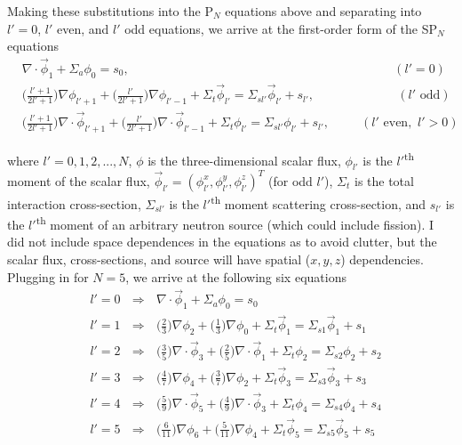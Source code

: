 \documentclass[10pt]{article}
\begin{document}
Making these substitutions into the P$_N$ equations above and separating into $l'=0$, $l'$ even, and $l'$ odd equations, we arrive at the first-order form of the SP$_N$ equations
%
\begin{align*}
    &\nabla \cdot \vec{\phi}_1 + \Sigma_a \phi_0 = s_0, \hspace{255pt}(l'=0)\\
    &\Big(\frac{l'+1}{2l'+1}\Big) \nabla\phi_{l'+1} + \Big(\frac{l'}{2l'+1}\Big)\nabla\phi_{l'-1} + \Sigma_t \vec{\phi}_{l'} = \Sigma_{sl'} \vec{\phi}_{l'} + s_{l'}, \hspace{80pt}(l'\textrm{ odd})\\
    &\Big(\frac{l'+1}{2l'+1}\Big) \nabla \cdot \vec{\phi}_{l'+1} + \Big(\frac{l'}{2l'+1}\Big)\nabla\cdot\vec{\phi}_{l'-1} + \Sigma_t \phi_{l'} = \Sigma_{sl'} \phi_{l'} + s_{l'}, \hspace{30pt}(l'\textrm{ even},\,\,l'>0)
\end{align*}

where $l'=0,1,2, ... , N$, $\phi$ is the three-dimensional scalar flux, $\phi_{l'}$ is the ${l'}$\textsuperscript{th} moment of the scalar flux, $\vec{\phi}_{l'} = (\phi_{l'}^x,\phi_{l'}^y,\phi_{l'}^z)^T$ (for odd $l'$), $\Sigma_t$ is the total interaction cross-section, $\Sigma_{sl'}$ is the ${l'}$\textsuperscript{th} moment scattering cross-section, and $s_{l'}$ is the ${l'}$\textsuperscript{th} moment of an arbitrary neutron source (which could include fission). I did not include space dependences in the equations as to avoid clutter, but the scalar flux, cross-sections, and source will have spatial ($x,y,z$) dependencies.\\

Plugging in for $N=5$, we arrive at the following six equations
%
\begin{align*}
    &l'=0\ \ \ \Rightarrow\ \ \ \nabla \cdot \vec{\phi}_1 + \Sigma_a \phi_0 = s_0\\
    &l'=1\ \ \ \Rightarrow\ \ \ \Big(\frac{2}{3}\Big) \nabla\phi_{2} + \Big(\frac{1}{3}\Big)\nabla\phi_{0} + \Sigma_t \vec{\phi}_{1} = \Sigma_{s1} \vec{\phi}_{1} + s_{1}\\
    &l'=2\ \ \ \Rightarrow\ \ \ \Big(\frac{3}{5}\Big) \nabla \cdot \vec{\phi}_{3} + \Big(\frac{2}{5}\Big)\nabla\cdot\vec{\phi}_{1} + \Sigma_t \phi_{2} = \Sigma_{s2} \phi_{2} + s_{2} \\
    &l'=3\ \ \ \Rightarrow\ \ \ \Big(\frac{4}{7}\Big) \nabla\phi_{4} + \Big(\frac{3}{7}\Big)\nabla\phi_{2} + \Sigma_t \vec{\phi}_{3} = \Sigma_{s3} \vec{\phi}_{3} + s_{3} \\
    &l'=4\ \ \ \Rightarrow\ \ \ \Big(\frac{5}{9}\Big) \nabla \cdot \vec{\phi}_{5} + \Big(\frac{4}{9}\Big)\nabla\cdot\vec{\phi}_{3} + \Sigma_t \phi_{4} = \Sigma_{s4} \phi_{4} + s_{4} \\
    &l'=5\ \ \ \Rightarrow\ \ \ \Big(\frac{6}{11}\Big) \nabla\phi_{6} + \Big(\frac{5}{11}\Big)\nabla\phi_{4} + \Sigma_t \vec{\phi}_{5} = \Sigma_{s5} \vec{\phi}_{5} + s_{5}
\end{align*}
\end{document}
